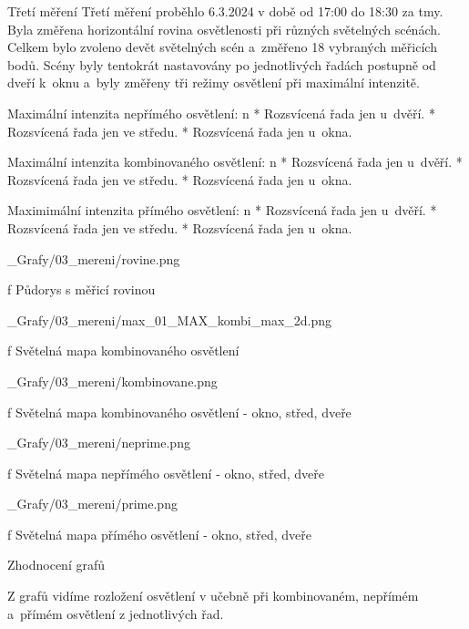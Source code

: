 \sec Třetí měření
Třetí měření proběhlo 6.3.2024 v době od 17:00 do 18:30 za tmy.
Byla změřena horizontální rovina osvětlenosti při různých světelných scénách.
Celkem bylo zvoleno devět světelných scén a~změřeno 18 vybraných měřicích bodů.
Scény byly tentokrát nastavovány po jednotlivých
řadách postupně od dveří k~oknu a~byly změřeny tři režimy osvětlení při maximální intenzitě.\noindent

\medskip\noindent
{\sbf Maximální intenzita nepřímého osvětlení:}
\begitems \style n
    * Rozsvícená řada jen u~dvěří.
    * Rozsvícená řada jen ve středu.
    * Rozsvícená řada jen u~okna.
\enditems

\medskip\noindent
{\sbf Maximální intenzita kombinovaného osvětlení:}
\begitems \style n
    * Rozsvícená řada jen u~dvěří.
    * Rozsvícená řada jen ve středu.
    * Rozsvícená řada jen u~okna.
\enditems


\medskip\noindent
{\sbf Maximimální intenzita přímého osvětlení:}
\begitems \style n
    * Rozsvícená řada jen u~dvěří.
    * Rozsvícená řada jen ve středu.
    * Rozsvícená řada jen u~okna.
\enditems

\medskip {}
\picw=8cm _Grafy/03_mereni/rovine.png
\caption/f Půdorys s měřicí rovinou
\medskip

\medskip {}
\picw=8cm _Grafy/03_mereni/max_01_MAX_kombi_max_2d.png
\caption/f Světelná mapa kombinovaného osvětlení
\medskip

\medskip {}
\picw=18cm _Grafy/03_mereni/kombinovane.png
\caption/f Světelná mapa kombinovaného osvětlení - okno, střed, dveře
\medskip

\medskip {}
\picw=18cm _Grafy/03_mereni/neprime.png
\caption/f Světelná mapa nepřímého osvětlení - okno, střed, dveře
\medskip

\medskip {}
\picw=18cm _Grafy/03_mereni/prime.png
\caption/f Světelná mapa přímého osvětlení - okno, střed, dveře
\medskip


\medskip\noindent
{\sbf Zhodnocení grafů}

Z grafů vidíme rozložení osvětlení v učebně při kombinovaném, nepřímém a~přímém osvětlení z jednotlivých řad.

